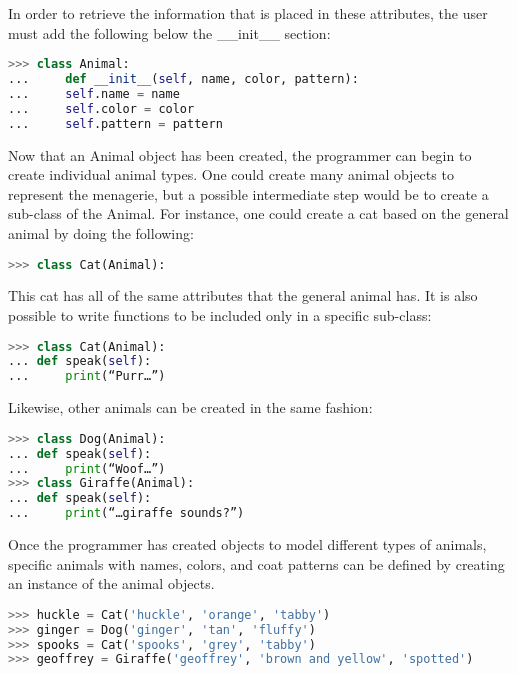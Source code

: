 In order to retrieve the information that is placed in these attributes, the user must add the following below the \_\_init\_\_ section:

\singlespace
\begin{lstlisting}[language=Python, caption=Defining attributes in classes]
>>> class Animal:
... 	def __init__(self, name, color, pattern):
...		self.name = name
...		self.color = color
...		self.pattern = pattern
\end{lstlisting}
\doublespace

Now that an Animal object has been created, the programmer can begin to create individual animal types. One could create many animal objects to represent the menagerie, but a possible intermediate step would be to create a sub-class of the Animal. For instance, one could create a cat based on the general animal by doing the following:

\singlespace
\begin{lstlisting}[language=Python, caption=Creating a subclass]
>>> class Cat(Animal):
\end{lstlisting}
\doublespace

This cat has all of the same attributes that the general animal has. It is also possible to write functions to be included only in a specific sub-class:

\singlespace
\begin{lstlisting}[language=Python, caption=Adding methods to a subclass]
>>> class Cat(Animal):
...	def speak(self):
...		print(“Purr…”)
\end{lstlisting}
\doublespace

Likewise, other animals can be created in the same fashion:

\singlespace
\begin{lstlisting}[language=Python, caption=Creating more subclasses]
>>> class Dog(Animal):
...	def speak(self):
...		print(“Woof…”)
>>> class Giraffe(Animal):
...	def speak(self):
...		print(“…giraffe sounds?”)
\end{lstlisting}
\doublespace

Once the programmer has created objects to model different types of animals, specific animals with names, colors, and coat patterns can be defined by creating an instance of the animal objects.

\singlespace
\begin{lstlisting}[language=Python, caption=Instantiating objects with attribute values]
>>> huckle = Cat('huckle', 'orange', 'tabby')
>>> ginger = Dog('ginger', 'tan', 'fluffy')
>>> spooks = Cat('spooks', 'grey', 'tabby')
>>> geoffrey = Giraffe('geoffrey', 'brown and yellow', 'spotted')
\end{lstlisting}
\doublespace

